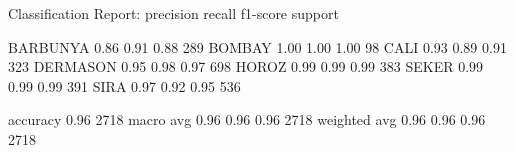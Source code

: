 \documentclass[10pt, conference]{IEEEtran}
\begin{document}
Classification Report:
              precision    recall  f1-score   support

    BARBUNYA       0.86      0.91      0.88       289
      BOMBAY       1.00      1.00      1.00        98
        CALI       0.93      0.89      0.91       323
    DERMASON       0.95      0.98      0.97       698
       HOROZ       0.99      0.99      0.99       383
       SEKER       0.99      0.99      0.99       391
        SIRA       0.97      0.92      0.95       536

    accuracy                           0.96      2718
   macro avg       0.96      0.96      0.96      2718
weighted avg       0.96      0.96      0.96      2718
\end{document}

